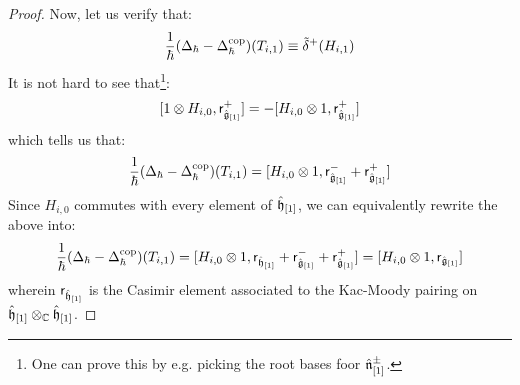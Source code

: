 \begin{proof}
                Now, let us verify that:
                    $$\frac{1}{\hbar}(\Delta_{\hbar} - \Delta_{\hbar}^{\mathrm{cop}})(T_{i, 1}) \equiv \tilde{\delta}^+(H_{i, 1})$$
                It is not hard to see that\footnote{One can prove this by e.g. picking the root bases foor $\hat{\mathfrak{n}}_{[1]}^{\pm}$.}:
                    $$[1 \tensor H_{i, 0}, \sfr_{ \hat{\g}_{[1]} }^+] = -[H_{i, 0} \tensor 1, \sfr_{ \hat{\g}_{[1]} }^+]$$
                which tells us that:
                    $$\frac{1}{\hbar}( \Delta_{\hbar} - \Delta_{\hbar}^{\cop} )(T_{i, 1}) = [H_{i, 0} \tensor 1, \sfr_{ \hat{\g}_{[1]} }^- + \sfr_{ \hat{\g}_{[1]} }^+]$$
                Since $H_{i, 0}$ commutes with every element of $\hat{\mathfrak{h}}_{[1]}$, we can equivalently rewrite the above into:
                    $$\frac{1}{\hbar}( \Delta_{\hbar} - \Delta_{\hbar}^{\cop} )(T_{i, 1}) = [H_{i, 0} \tensor 1, \sfr_{\hat{\h}_{[1]}} + \sfr_{ \hat{\g}_{[1]} }^- + \sfr_{ \hat{\g}_{[1]} }^+] = [H_{i, 0} \tensor 1, \sfr_{ \hat{\g}_{[1]} }]$$
                wherein $\mathsf{r}_{\hat{\mathfrak{h}}_{[1]}}$ is the Casimir element associated to the Kac-Moody pairing on $\hat{\h}_{[1]} \tensor_{\bbC} \hat{\h}_{[1]}$. 


\end{proof}
